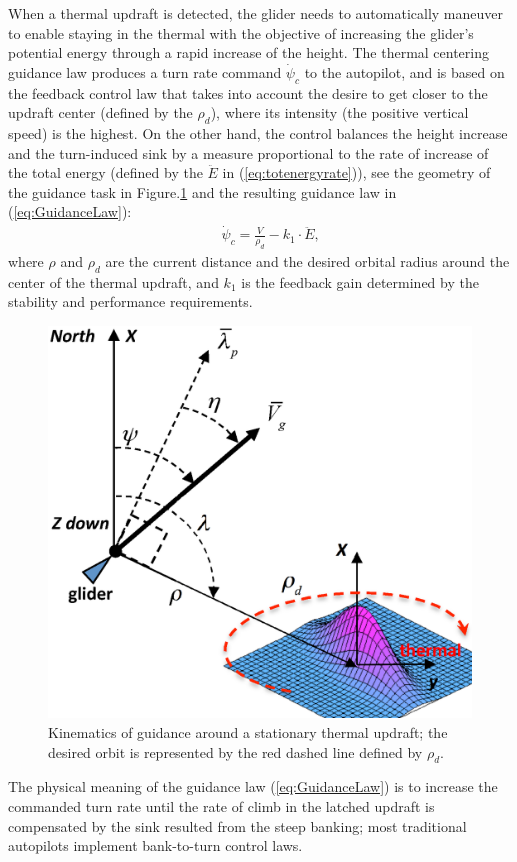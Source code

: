 \documentclass[letterpaper, 10 pt, conference]{ieeeconf}  %
\begin{document}

When a thermal updraft is detected, the glider needs to automatically maneuver to enable staying in the thermal with the objective of increasing the glider's potential energy through a rapid increase of the height. The thermal centering guidance law produces a turn rate command $\dot{\psi}_{c}$ to the autopilot, and is based on the feedback control law that takes into account the desire to get closer to the updraft center (defined by the $\rho_d$), where its intensity (the positive vertical speed) is the highest. On the other hand, the control balances the height increase and the turn-induced sink by a measure proportional to the rate of increase of the total energy (defined by the $\ddot{E}$ in (\ref{eq:totenergyrate})), see the geometry of the guidance task in Figure.\ref{fig:ThermaG} and the resulting guidance law in (\ref{eq:GuidanceLaw}):
\begin{eqnarray}
    && \dot{\psi}_{c}=\frac{V}{\rho_d}-k_1 \cdot \ddot{E},
    \label{eq:GuidanceLaw}
\end{eqnarray}
where $\rho$ and $\rho_d$ are the current distance and the desired orbital radius around the center of the thermal updraft, and $k_1$ is the feedback gain determined by the stability and performance requirements.
\begin{figure}[thpb]
  \centering
  \includegraphics[scale=0.3]{Figures/ThermalG.eps}
  \caption{Kinematics of guidance around a stationary thermal updraft;
  the desired orbit is represented by the red dashed line defined by $\rho_d$.}
  \label{fig:ThermaG}
\end{figure}
The physical meaning of the guidance law (\ref{eq:GuidanceLaw}) is to increase the commanded turn rate until the rate of climb in the latched updraft is compensated by the sink resulted from the steep banking; most traditional autopilots implement bank-to-turn control laws.
\end{document}
